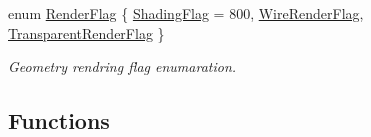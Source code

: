 \begin{DoxyCompactItemize}
enum \hyperlink{namespaceglc_a51a421b53283d5996142222b9baca26c}{Render\-Flag} \{ \hyperlink{namespaceglc_a51a421b53283d5996142222b9baca26cad7fd33537da15e115a2d093f658d5e5f}{Shading\-Flag} = 800, 
\hyperlink{namespaceglc_a51a421b53283d5996142222b9baca26ca2a2571eb10c27dc0fa3fad00ba1d6cb9}{Wire\-Render\-Flag}, 
\hyperlink{namespaceglc_a51a421b53283d5996142222b9baca26cac40bc3e069532f1c43d45ee934c927eb}{Transparent\-Render\-Flag}
 \}
\begin{DoxyCompactList}\small\item\em Geometry rendring flag enumaration. \end{DoxyCompactList}\end{DoxyCompactItemize}
\subsection*{Functions}
